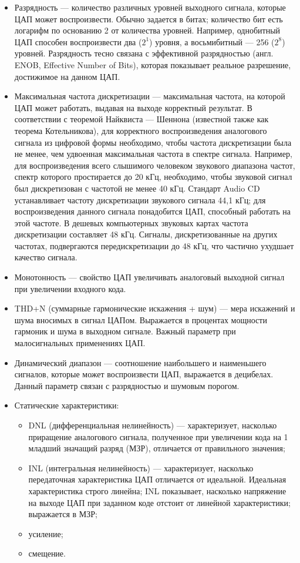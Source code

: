 \begin{itemize}
\item Разрядность --- количество различных уровней выходного сигнала, которые ЦАП может воспроизвести. Обычно задается в битах; количество бит есть логарифм по основанию 2 от количества уровней. Например, однобитный ЦАП способен воспроизвести два ($2^1$) уровня, а восьмибитный --- 256 ($2^8$) уровней. Разрядность тесно связана с эффективной разрядностью (англ. ENOB, Effective Number of Bits), которая показывает реальное разрешение, достижимое на данном ЦАП.

\item Максимальная частота дискретизации --- максимальная частота, на которой ЦАП может работать, выдавая на выходе корректный результат. В соответствии с теоремой Найквиста --- Шеннона (известной также как теорема Котельникова), для корректного воспроизведения аналогового сигнала из цифровой формы необходимо, чтобы частота дискретизации была не менее, чем удвоенная максимальная частота в спектре сигнала. Например, для воспроизведения всего слышимого человеком звукового диапазона частот, спектр которого простирается до 20 кГц, необходимо, чтобы звуковой сигнал был дискретизован с частотой не менее 40 кГц. Стандарт Audio CD устанавливает частоту дискретизации звукового сигнала 44,1 кГц; для воспроизведения данного сигнала понадобится ЦАП, способный работать на этой частоте. В дешевых компьютерных звуковых картах частота дискретизации составляет 48 кГц. Сигналы, дискретизованные на других частотах, подвергаются передискретизации до 48 кГц, что частично ухудшает качество сигнала.

\item Монотонность --- свойство ЦАП увеличивать аналоговый выходной сигнал при увеличении входного кода.

\item THD+N (суммарные гармонические искажения + шум) --- мера искажений и шума вносимых в сигнал ЦАПом. Выражается в процентах мощности гармоник и шума в выходном сигнале. Важный параметр при малосигнальных применениях ЦАП.

\item Динамический диапазон --- соотношение наибольшего и наименьшего сигналов, которые может воспроизвести ЦАП, выражается в децибелах. Данный параметр связан с разрядностью и шумовым порогом.

\item Статические характеристики:
	\begin{itemize}
	\item DNL (дифференциальная нелинейность) --- характеризует, насколько приращение аналогового сигнала, полученное при увеличении кода на 1 младший значащий разряд (МЗР), отличается от правильного значения;
	\item INL (интегральная нелинейность) --- характеризует, насколько передаточная характеристика ЦАП отличается от идеальной. Идеальная характеристика строго линейна; INL показывает, насколько напряжение на выходе ЦАП при заданном коде отстоит от линейной характеристики; выражается в МЗР;
	\item усиление;
	\item смещение.
	\end{itemize}


\end{itemize}
